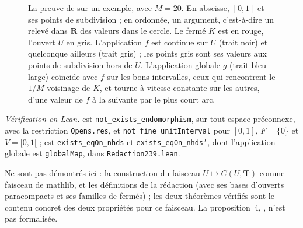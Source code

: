 \begin{figure}[htbp]
\caption{La preuve de  sur un exemple, avec $M = 20$. En abscisse, $[0, 1]$ et ses points de subdivision ; en ordonnée, un argument, c'est-à-dire un relevé dans $\mathbf R$ des valeurs dans le cercle. Le fermé $K$ est en rouge, l'ouvert $U$ en gris. L'application $f$ est continue sur $U$ (trait noir) et quelconque ailleurs (trait gris) ; les points gris sont ses valeurs aux points de subdivision hors de $U$. L'application globale $g$ (trait bleu large) coïncide avec $f$ sur les bons intervalles, ceux qui rencontrent le $1/M$-voisinage de $K$, et tourne à vitesse constante sur les autres, d'une valeur de $f$ à la suivante par le plus court arc.}
\label{fig:bourbaki-239}
\end{figure}

\begin{sloppypar}
\noindent\emph{Vérification en Lean.}  est \texttt{not\_exists\_endomorphism}, sur tout espace préconnexe, avec la restriction \texttt{Opens.\allowbreak{}res}, et \texttt{not\_fine\_unitInterval} pour $[0, 1]$, $F = \{0\}$ et $V = [0, 1[$ ;  est \texttt{exists\_eqOn\_nhds} et \texttt{exists\_eqOn\_nhds'}, dont l'application globale est \texttt{globalMap}, dans \href{\leanblobmain/Redaction239.lean}{\texttt{Redaction239.\allowbreak{}lean}}.
\end{sloppypar}

Ne sont pas démontrés ici : la construction du faisceau $U \mapsto C(U, \mathbf T)$ comme faisceau de mathlib, et les définitions de la rédaction (avec ses bases d'ouverts paracompacts et ses familles de fermés) ; les deux théorèmes vérifiés sont le contenu concret des deux propriétés pour ce faisceau. La proposition~4, , n'est pas formalisée.

